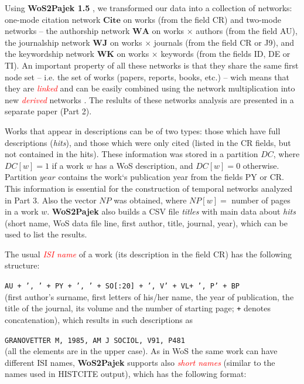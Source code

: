 \documentclass[11pt]{article} %
\newcommand{\keyw}[1]{\textcolor{red}{\emph{#1}}}
\newcommand{\WA}{\mathbf{W\!\!A}}
\newcommand{\WK}{\mathbf{W\!K}}
\newcommand{\WJ}{\mathbf{W\!J}}
\newcommand{\Ci}{\mathbf{Cite}}
\newcommand{\NP}{N\!P}
\begin{document}
Using \textbf{WoS2Pajek 1.5} \citep{wos2pajek}, we transformed our data into a collection of networks: one-mode citation network $\Ci$ on works (from the field CR) and two-mode networks -- the authorship network $\WA$ on works $\times$ authors  (from the field AU),  the journalship network $\WJ$ on  works $\times$ journals  (from the field CR or J9), and the keywordship network $\WK$ on works  $\times$ keywords (from the fields ID, DE or TI). An important property of all these networks is that they share the same first node set -- i.e. the set of works (papers, reports, books, etc.) -- wich means that they are \keyw{linked} and can be easily combined using the network multiplication into new \keyw{derived}  networks \citep{Understand}. The reslults of these networks analysis are presented in a separate paper (Part 2).  \medskip

Works that appear in descriptions can be of two types: those which have full descriptions (\textit{hits}), and those which were only cited (listed in the CR fields, but not contained in the hits). These information was stored in a partition $DC$, where $DC[w] = 1$ if a work $w$ has a WoS description, and $DC[w] = 0$ otherwise. Partition $year$ contains the work`s publication year from the fields PY or CR. This information is essential for the construction of temporal networks analyzed in Part 3. Also the vector $\NP$ was obtained, where $\NP[w] =$ number of pages in a work $w$. \textbf{WoS2Pajek} also builds a CSV file \textit{titles} with main data about \textit{hits} (short name, WoS data file line, first author, title, journal, year), which can be used to list the results. \medskip 

The usual \keyw{ISI name} of a work (its description in the field CR) has the following structure: \smallskip
 
 \texttt {AU {+ ', ' +} PY \texttt{+ ', ' +} SO[:20] \texttt{+ ', V' +} VL\texttt{+ ', P' +} BP}  \smallskip\\
(first author's surname, first letters of his/her name, the year of publication, the title of the journal, its volume and the number of starting page; \texttt{+} denotes concatenation), which results in such descriptions as \smallskip

\texttt{GRANOVETTER M, 1985, AM J SOCIOL, V91, P481}\smallskip\\  (all the elements are in the upper case). As in WoS the same work can have different ISI names, \textbf{WoS2Pajek} supports also \keyw{short names} (similar to the names used in HISTCITE output), which has the following format:\smallskip
\end{document}
